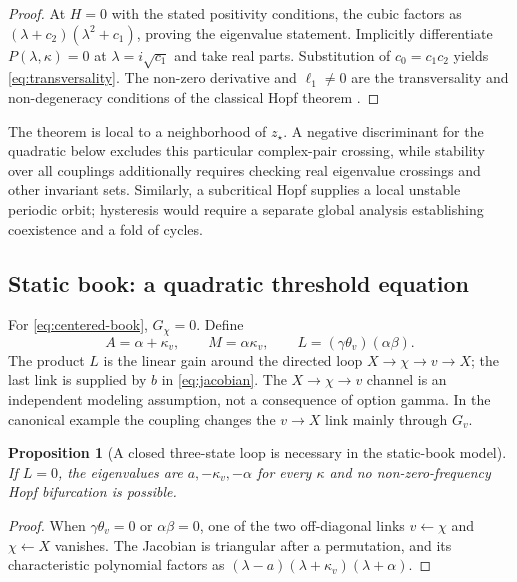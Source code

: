 \documentclass[11pt]{article}
\newtheorem{proposition}{Proposition}
\begin{document}
\begin{proof}
At $H=0$ with the stated positivity conditions, the cubic factors as
$(\lambda+c_2)(\lambda^2+c_1)$, proving the eigenvalue statement.  Implicitly
differentiate $P(\lambda,\kappa)=0$ at $\lambda=i\sqrt{c_1}$ and take real
parts.  Substitution of $c_0=c_1c_2$ yields \eqref{eq:transversality}.  The
non-zero derivative and $\ell_1\neq0$ are the transversality and non-degeneracy
conditions of the classical Hopf theorem \citep{liu1994,kuznetsov2004}.
\end{proof}

The theorem is local to a neighborhood of $z_\star$.  A negative discriminant for the
quadratic below excludes this particular complex-pair crossing, while stability over all
couplings additionally requires checking real eigenvalue crossings and other invariant sets.
Similarly, a subcritical Hopf supplies a local unstable periodic orbit; hysteresis would
require a separate global analysis establishing coexistence and a fold of cycles.

\subsection{Static book: a quadratic threshold equation}
\label{sec:quadratic}

For \eqref{eq:centered-book}, $G_\chi=0$.  Define
\[
A=\alpha+\kappa_v,\qquad M=\alpha\kappa_v,
\qquad L=(\gamma\theta_v)(\alpha\beta).
\]
The product $L$ is the linear gain around the directed loop
$X\to\chi\to v\to X$; the last link is supplied by $b$ in
\eqref{eq:jacobian}.  The $X\to\chi\to v$ channel is an independent modeling assumption,
not a consequence of option gamma.  In the canonical example the coupling changes the
$v\to X$ link mainly through $G_v$.

\begin{proposition}[A closed three-state loop is necessary in the static-book model]
\label{prop:closed-loop}
If $L=0$, the eigenvalues are $a,-\kappa_v,-\alpha$ for every $\kappa$ and no
non-zero-frequency Hopf bifurcation is possible.
\end{proposition}

\begin{proof}
When $\gamma\theta_v=0$ or $\alpha\beta=0$, one of the two off-diagonal links
$v\leftarrow\chi$ and $\chi\leftarrow X$ vanishes.  The Jacobian is triangular after a
permutation, and its characteristic polynomial factors as
$(\lambda-a)(\lambda+\kappa_v)(\lambda+\alpha)$.
\end{proof}
\end{document}
